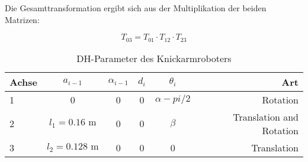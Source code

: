 Die Gesamttransformation ergibt sich aus der Multiplikation der beiden Matrizen:

\begin{equation*}
	T_{03} = T_{01} \cdot T_{12} \cdot T_{23}
\end{equation*}

\begin{table}[tb]
	\centering
	\begin{tabular}{lccccr}
		\toprule
		Achse & $a_{i-1}$ & $\alpha_{i-1}$ & $d_i$ & $\theta_i$ & Art \\
		\midrule
		1 & 0& 0& 0& $\alpha - pi/2 $& Rotation \\
		2 & $l_1 = 0.16 \text{ m}$& 0& 0& $\beta$& Translation and Rotation\\
		3 & $l_2 = 0.128 \text{ m}$& 0& 0& 0& Translation\\ 
		\bottomrule
	\end{tabular}
	\caption{DH-Parameter des Knickarmroboters}
	\label{tab:DH}
\end{table}